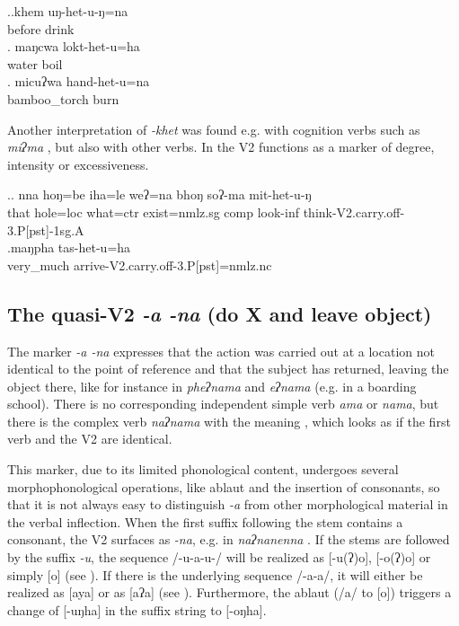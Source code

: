 \ex.\ag.khem uŋ-het-u-ŋ=na\\
before drink\\
\bg. maŋcwa lokt-het-u=ha\\
water boil\\
\bg. micuʔwa hand-het-u=na\\
bamboo\_torch burn\\

Another interpretation of \emph{-khet} was found e.g. with cognition verbs such as \emph{miʔma} , but also with other verbs. In \Next the V2 functions as a marker of degree, intensity or excessiveness.

\ex.\ag.  nna  hoŋ=be    iha=le   weʔ=na        bhoŋ soʔ-ma    mit-het-u-ŋ\\
that hole{\sc =loc} what{\sc =ctr} exist{\sc [3sg]=nmlz.sg} {\sc comp} look{\sc -inf} think{\sc -V2.carry.off-3.P[pst]-1sg.A}\\
 
\bg.maŋpha tas-het-u=ha\\
very\_much arrive{\sc -V2.carry.off-3.P[pst]=nmlz.nc}\\


\subsection{The quasi-V2 \emph{-a \ti -na} (do X and leave object)}\label{V2-leave}%

The marker \emph{-a \ti -na} expresses that the action was carried out at a location not identical to the point of reference and that the subject has returned, leaving the object there, like for instance in \emph{pheʔnama}  and \emph{eʔnama}  (e.g. in a boarding school). There is no corresponding independent simple verb \emph{ama} or \emph{nama}, but there is the complex verb \emph{naʔnama} with the meaning , which looks as if the first verb and the V2 are identical. 

This marker, due to its limited phonological content, undergoes several morphophonological operations, like ablaut and the insertion of consonants, so that it is not always easy to distinguish \emph{-a} from other morphological material in the verbal inflection. When the first suffix following the stem contains a consonant, the V2 surfaces as \emph{-na}, e.g. in \emph{naʔnanenna} . If the stems are followed by the suffix \emph{-u}, the sequence /-u-a-u-/ will be realized as [-u(ʔ)o], [-o(ʔ)o] or simply [o] (see \Next). If there is the underlying sequence /-a-a/, it will either be realized as [aya] or as [aʔa] (see \NNext).  Furthermore, the ablaut (/a/ to [o]) triggers a change of  [-uŋha]  in the suffix string to [-oŋha]. 
 
